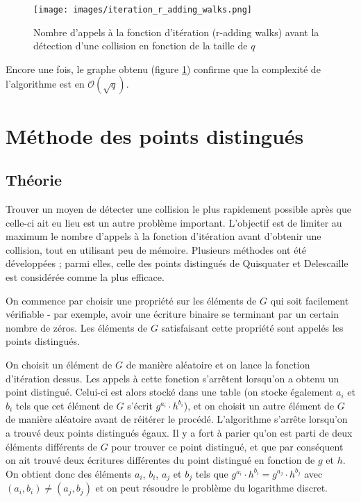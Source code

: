       \begin{figure}
        \center{}
        \texttt{[image: images/iteration\_r\_adding\_walks.png]}
        \caption{Nombre d'appels à la fonction d'itération (r-adding walks) avant la détection d'une collision en fonction de la taille de $q$}
        \label{fig:r_adding_walks_iteration_results}
      \end{figure}

      Encore une fois, le graphe obtenu (figure \ref{fig:r_adding_walks_iteration_results}) confirme que la complexité de l'algorithme est en $\mathcal{O}(\sqrt{q})$.


    \section{Méthode des points distingués}
      \subsection{Théorie}
      Trouver un moyen de détecter une collision le plus rapidement possible après que celle-ci ait eu lieu est un autre problème important.  L'objectif est de limiter au maximum le nombre d'appels à la fonction d'itération avant d'obtenir une collision, tout en utilisant peu de mémoire. Plusieurs méthodes ont été développées ; parmi elles, celle des points distingués de Quisquater et Delescaille~\autocite[4]{pollard1} est considérée comme la plus efficace.

      On commence par choisir une propriété sur les éléments de $G$ qui soit facilement vérifiable - par exemple, avoir une écriture binaire se terminant par un certain nombre de zéros. Les éléments de $G$ satisfaisant cette propriété sont appelés les points distingués.

      On choisit un élément de $G$ de manière aléatoire et on lance la fonction d'itération dessus. Les appels à cette fonction s'arrêtent lorsqu'on a obtenu un point distingué. Celui-ci est alors stocké dans une table (on stocke également $a_i$ et $b_i$ tels que cet élément de $G$ s'écrit $g^{a_i} \cdot h^{b_i}$), et on choisit un autre élément de $G$ de manière aléatoire avant de réitérer le procédé. L'algorithme s'arrête lorsqu'on a trouvé deux points distingués égaux. Il y a fort à parier qu'on est parti de deux éléments différents de $G$ pour trouver ce point distingué, et que par conséquent on ait trouvé deux écritures différentes du point distingué en fonction de $g$ et $h$. On obtient donc des éléments $a_i$, $b_i$, $a_j$ et $b_j$ tels que $g^{a_i} \cdot h^{b_i} = g^{a_j} \cdot h^{b_j}$ avec $(a_i,b_i) \neq (a_j,b_j)$ et on peut résoudre le problème du logarithme discret.

